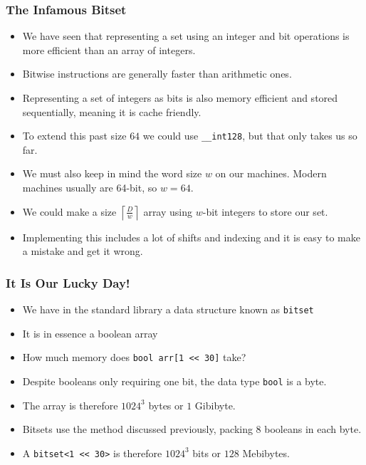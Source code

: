 \documentclass[10pt]{beamer}
\begin{document}
\begin{frame}
    \frametitle{The Infamous Bitset}
    \begin{itemize}
        \item We have seen that representing a set using an integer and bit operations is more efficient than an array of integers.
        \item<2-> Bitwise instructions are generally faster than arithmetic ones.
        \item<3-> Representing a set of integers as bits is also memory efficient and stored sequentially, meaning it is cache friendly.
        \item<4-> To extend this past size $64$ we could use \texttt{\_\_int128}, but that only takes us so far.
        \item<5-> We must also keep in mind the word size $w$ on our machines. Modern machines usually are 64-bit, so $w=64$.
        \item<6-> We could make a size $\left\lceil \frac{D}{w} \right\rceil$ array using $w$-bit integers to store our set.
        \item<7-> Implementing this includes a lot of shifts and indexing and it is easy to make a mistake and get it wrong.
    \end{itemize}
\end{frame}

\begin{frame}
    \frametitle{It Is Our Lucky Day!}
    \begin{itemize}
        \item We have in the standard library a data structure known as \texttt{bitset}
        \item<2-> It is in essence a boolean array
        \item<3-> How much memory does \texttt{bool arr[1 << 30]} take?
        \item<4-> Despite booleans only requiring one bit, the data type \texttt{bool} is a byte.
        \item<5-> The array is therefore $1024^3$ bytes or $1$ Gibibyte.
        \item<6-> Bitsets use the method discussed previously, packing $8$ booleans in each byte.
        \item<7-> A \texttt{bitset<1 << 30>} is therefore $1024^3$ bits or $128$ Mebibytes.
    \end{itemize}
\end{frame}
\end{document}
